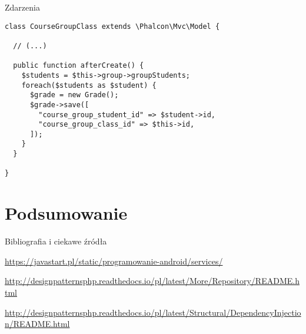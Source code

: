 \begin{frame}[fragile]{Zdarzenia}
	\begin{lstlisting}
class CourseGroupClass extends \Phalcon\Mvc\Model {

  // (...)

  public function afterCreate() {
    $students = $this->group->groupStudents;
    foreach($students as $student) {
      $grade = new Grade();
      $grade->save([
        "course_group_student_id" => $student->id,
        "course_group_class_id" => $this->id,
      ]);
    }
  }
  
}

	\end{lstlisting}
\end{frame}

\section{Podsumowanie}

\begin{frame}{Bibliografia i ciekawe źródła}
  
	\begin{thebibliography}{9}
		
		\url{https://javastart.pl/static/programowanie-android/services/}
		
		\url{http://designpatternsphp.readthedocs.io/pl/latest/More/Repository/README.html}
		
		\url{http://designpatternsphp.readthedocs.io/pl/latest/Structural/DependencyInjection/README.html}
		
	\end{thebibliography}

\end{frame}

